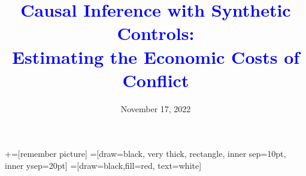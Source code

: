 \documentclass[notes,11pt, aspectratio=169]{beamer}
\title[]{\textcolor{blue}{Causal Inference with Synthetic Controls:\\ Estimating the Economic Costs of Conflict }}
\institute[GSB]{\small{\begin{tabular}{c}
Alexander J. Almeida \\
Stanford Graduate School of Business\\
\end{tabular}}}
\date{November 17, 2022}
\begin{document}
\newcommand\marktopleft[1]{%
    \tikz[overlay,remember picture] 
        \node (marker-#1-a) at (-.3em,.3em) {};%
}
\newcommand\markbottomright[2]{%
    \tikz[overlay,remember picture] 
        \node (marker-#1-b) at (0em,0em) {};%
}
+=[remember picture] 
 =[draw=black, very thick, rectangle, inner sep=10pt, inner ysep=20pt]
 =[draw=black,fill=red, text=white]

\begin{frame}
\maketitle
\end{frame}




% 

\end{document}
